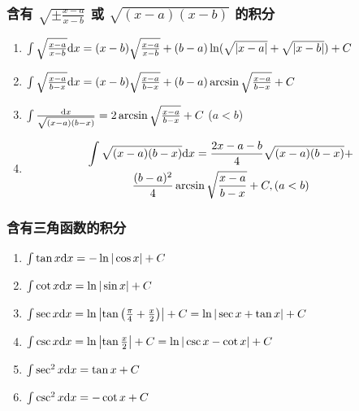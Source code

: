 \begin{small}
\begin{enumerate}
\end{enumerate}

\subsubsection{含有 $\sqrt{\pm\frac{x-a}{x-b}}$ 或 $\sqrt{(x-a)(x-b)}$ 的积分}

\begin{enumerate}

\item $ \int \sqrt\frac{x-a}{x-b} \mathrm{d} x = (x-b)\sqrt\frac{x-a}{x-b} + (b-a)\ln(\sqrt{|x-a|}+\sqrt{|x-b|}) + C $

\item $ \int \sqrt\frac{x-a}{b-x} \mathrm{d} x = (x-b)\sqrt\frac{x-a}{b-x} + (b-a)\arcsin\sqrt\frac{x-a}{b-x} + C $

\item $ \int \frac{\mathrm{d} x}{\sqrt{(x-a)(b-x)}} = 2\arcsin\sqrt\frac{x-a}{b-x} + C$ ($a<b$)

\item \begin{multline}
\int \sqrt{(x-a)(b-x)} \mathrm{d} x = \frac{2x-a-b}{4}\sqrt{(x-a)(b-x)} + \\
	\frac{(b-a)^2}{4}\arcsin\sqrt\frac{x-a}{b-x} + C, (a<b)
\end{multline}

\end{enumerate}

\subsubsection{含有三角函数的积分}

\begin{enumerate}

\item $ \int \tan x \mathrm{d} x = -\ln|\cos x| + C $

\item $ \int \cot x \mathrm{d} x = \ln |\sin x| + C $

\item $ \int \sec x \mathrm{d} x = \ln \left| \tan\left( \frac{\pi}{4} + \frac{x}{2} \right) \right| + C = \ln |\sec x + \tan x| + C $

\item $ \int \csc x \mathrm{d} x = \ln \left| \tan\frac{x}{2} \right| + C = \ln |\csc x - \cot x| + C $

\item $ \int \sec^2 x \mathrm{d} x = \tan x + C $

\item $ \int \csc^2 x \mathrm{d} x = -\cot x + C $


\end{enumerate}
\end{small}

